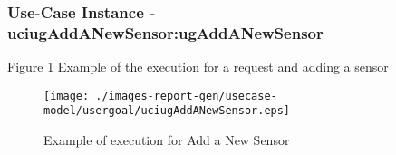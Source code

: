 
	\subsubsection{Use-Case Instance - uciugAddANewSensor:ugAddANewSensor}
	

	
	Figure \ref{fig:lu.uni.lassy.excalibur.group01.excalibur-RE-UC-uciugAddANewSensor}
	Example of the execution for a request and adding a sensor
	
	\begin{figure}[htbp]
	\begin{center}
	
	\texttt{[image: ./images-report-gen/usecase-model/usergoal/uciugAddANewSensor.eps]}
	\end{center}
	\caption[lu.uni.lassy.excalibur.group01.excalibur Sequence Diagram: uciugAddANewSensor]{Example of execution for Add a New Sensor}
	\label{fig:lu.uni.lassy.excalibur.group01.excalibur-RE-UC-uciugAddANewSensor}
	\end{figure}
	\vspace{0.5cm}
